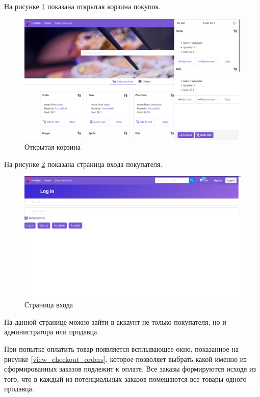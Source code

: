 {  На рисунке \ref{view_cart} показана открытая корзина покупок.

  \begin{figure}[H]
    \centering
    \includegraphics[width=\textwidth]{cart.png}
    \caption{Открытая корзина}
    \label{view_cart}
  \end{figure}

  На рисунке \ref{view_login} показана страница входа покупателя.

  \begin{figure}[H]
    \centering
    \includegraphics[width=\textwidth]{login_page.png}
    \caption{Страница входа}
    \label{view_login}
  \end{figure}
  На данной странице можно зайти в аккаунт не только покупателя,
  но и администратора или продавца.

  При попытке оплатить товар появляется всплывающее окно, показанное на рисунке \ref{view_checkout_orders},
  которое позволяет выбрать какой именно из сформированных
  заказов подлежит к оплате. Все заказы формируются
  исходя из того, что в каждый из потенциальных заказов помещаются
  все товары одного продавца.

}
